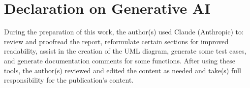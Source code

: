 \section*{Declaration on Generative AI}

During the preparation of this work, the author(s) used Claude (Anthropic) to:
review and proofread the report, reformulate certain sections for improved readability,
assist in the creation of the UML diagram,
generate some test cases,
and generate documentation comments for some functions.
After using these tools, the author(s) reviewed and edited the content as needed
and take(s) full responsibility for the publication's content.

